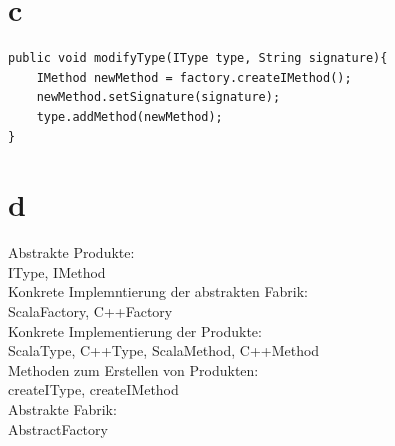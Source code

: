 \section{c}
\begin{lstlisting}[caption = {Aufgabe 1 c}]
public void modifyType(IType type, String signature){
 	IMethod newMethod = factory.createIMethod();
 	newMethod.setSignature(signature);
	type.addMethod(newMethod);
}
\end{lstlisting}

\section{d}
Abstrakte Produkte:\\
IType, IMethod\\


Konkrete Implemntierung der abstrakten Fabrik:\\
ScalaFactory, C++Factory\\


Konkrete Implementierung der Produkte:\\
ScalaType, C++Type, ScalaMethod, C++Method\\


Methoden zum Erstellen von Produkten:\\
createIType, createIMethod\\


Abstrakte Fabrik:\\
AbstractFactory\\




%
%
%
%


